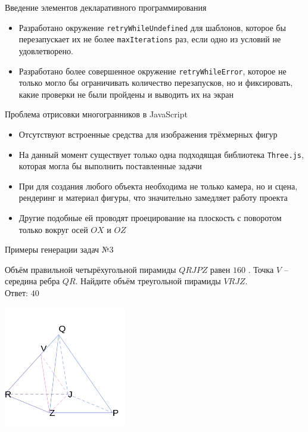 \documentclass[aspectratio=169,12pt]{beamer}
\begin{document}
\begin{frame}{Введение элементов декларативного программирования}
	
	\begin{itemize}
		\item Разработано окружение \texttt{retryWhileUndefined} для шаблонов, которое бы перезапускает их не более \texttt{maxIterations} раз, если одно из условий не удовлетворено.
		\item Разработано более совершенное окружение \texttt{retryWhileError}, которое не только могло бы ограничивать количество перезапусков, но и фиксировать, какие проверки не были пройдены и выводить их на экран
	\end{itemize}

\end{frame}

\begin{frame}{Проблема отрисовки многогранников в JavaScript}
	\begin{itemize}
		\item Отсутствуют встроенные средства для изображения трёхмерных фигур
		\item На данный момент существует только одна подходящая библиотека \texttt{Three.js}, которая могла бы выполнить поставленные задачи
		\item При для создания любого объекта необходима не только камера, но и сцена, рендеринг и материал фигуры, что значительно замедляет работу проекта
		\item Другие подобные ей проводят проецирование на плоскость с поворотом только вокруг осей $OX$ и $OZ$
	\end{itemize}
\end{frame}

\begin{frame}{Примеры генерации задач №3}
	\begin{multicols}{2}
		Объём правильной четырёхугольной пирамиды $QRJPZ$ равен $160$ . Точка $V$  – середина ребра  $QR$. Найдите объём треугольной пирамиды  $VRJZ$.\\

		Ответ: $40$

		\includegraphics[width=0.4\textwidth]{1.png}
	\end{multicols}

\end{frame}
\end{document}
